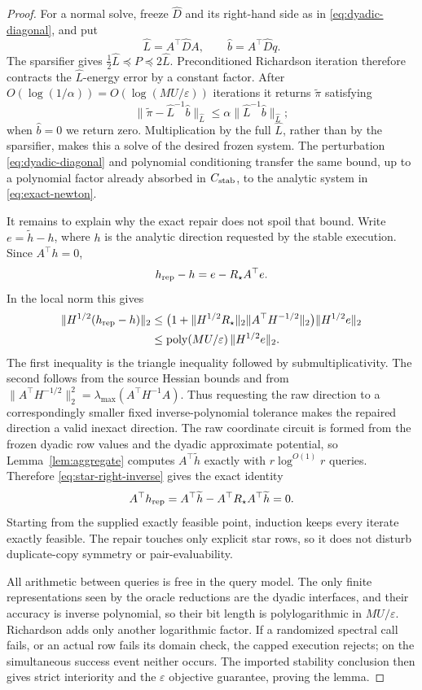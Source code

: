 \documentclass[11pt]{article}
\theoremstyle{definition}
\newcommand{\eps}{\varepsilon}
\newcommand{\poly}{\operatorname{poly}}
\begin{document}
\begin{proof}
For a normal solve, freeze $\widehat D$ and its right-hand side as in
\eqref{eq:dyadic-diagonal}, and put
\[
 \widehat L=A^\top\widehat D A,\qquad
 \widehat b=A^\top\widehat Dq.
\]
The sparsifier gives
$\frac12\widehat L\preceq P\preceq2\widehat L$.
Preconditioned Richardson iteration therefore contracts the
$\widehat L$-energy error by a constant factor.  After
$O(\log(1/\alpha))=O(\log(MU/\eps))$ iterations it returns
$\widetilde\pi$ satisfying
\[
 \|\widetilde\pi-\widehat L^{-1}\widehat b\|_{\widehat L}
 \le
 \alpha\|\widehat L^{-1}\widehat b\|_{\widehat L};
\]
when $\widehat b=0$ we return zero.  Multiplication by the full
$\widehat L$, rather than by the sparsifier, makes this a solve of the
desired frozen system.  The perturbation
\eqref{eq:dyadic-diagonal} and polynomial conditioning transfer the same
bound, up to a polynomial factor already absorbed in $C_{\rm stab}$, to the
analytic system in \eqref{eq:exact-newton}.

It remains to explain why the exact repair does not spoil that bound.  Write
$e=\widetilde h-h$, where $h$ is the analytic direction requested by the
stable execution.  Since $A^\top h=0$,
\[
 h_{\rm rep}-h=e-R_\star A^\top e .
\]
In the local norm this gives
\begin{align*}
 \|H^{1/2}(h_{\rm rep}-h)\|_2
 &\le
 \bigl(1+
 \|H^{1/2}R_\star\|_2
 \|A^\top H^{-1/2}\|_2\bigr)
 \|H^{1/2}e\|_2\\
 &\le \poly(MU/\eps)\,\|H^{1/2}e\|_2.
\end{align*}
The first inequality is the triangle inequality followed by
submultiplicativity.  The second follows from the source Hessian bounds and from
$\|A^\top H^{-1/2}\|_2^2=\lambda_{\max}(A^\top H^{-1}A)$.
Thus requesting the raw direction to a correspondingly smaller fixed
inverse-polynomial tolerance makes the repaired direction a valid inexact
direction.  The raw coordinate circuit is formed from the frozen dyadic row
values and the dyadic approximate potential, so
Lemma~\ref{lem:aggregate} computes $A^\top\widetilde h$ exactly with
$r\log^{O(1)}r$ queries.  Therefore
\eqref{eq:star-right-inverse} gives the exact identity
\[
 A^\top h_{\rm rep}
 =A^\top\widetilde h-A^\top R_\star A^\top\widetilde h=0.
\]
Starting from the supplied exactly feasible point, induction keeps every
iterate exactly feasible.  The repair touches only explicit star rows, so it
does not disturb duplicate-copy symmetry or pair-evaluability.

All arithmetic between queries is free in the query model.  The only finite
representations seen by the oracle reductions are the dyadic interfaces, and
their accuracy is inverse polynomial, so their bit length is polylogarithmic
in $MU/\eps$.  Richardson adds only another logarithmic factor.
If a randomized spectral call fails, or an actual row fails its domain check,
the capped execution rejects; on the simultaneous success event neither
occurs.  The imported stability conclusion then gives strict interiority and
the $\eps$ objective guarantee, proving the lemma.
\end{proof}
\end{document}
